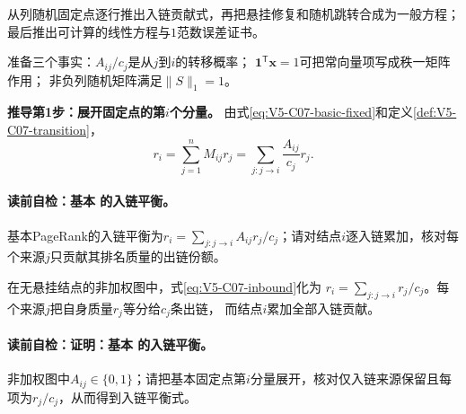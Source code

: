\label{struct:V5-C07-CH11}

\begin{derivationgoalbox}
从列随机固定点逐行推出入链贡献式，再把悬挂修复和随机跳转合成为一般\PageRank{}方程；
最后推出可计算的线性方程与$1$范数误差证书。
\end{derivationgoalbox}
\begin{derivationprepbox}
准备三个事实：$A_{ij}/c_j$是从$j$到$i$的转移概率；
$\boldsymbol1^{\mathsf T}\boldsymbol x=1$可把常向量项写成秩一矩阵作用；
非负列随机矩阵满足$\|S\|_1=1$。
\end{derivationprepbox}

\textbf{推导第1步：展开固定点的第$i$个分量。}
由式\eqref{eq:V5-C07-basic-fixed}和定义\ref{def:V5-C07-transition}，
\begin{equation}
r_i=\sum_{j=1}^nM_{ij}r_j
=\sum_{j:j\to i}\frac{A_{ij}}{c_j}r_j.
\label{eq:V5-C07-inbound}
\end{equation}
\paragraph{读前自检：基本 的入链平衡。}基本PageRank的入链平衡为$r_i=\sum_{j:j\to i}A_{ij}r_j/c_j$；请对结点$i$逐入链累加，核对每个来源$j$只贡献其排名质量的出链份额。\par

\begin{proposition}\label{prop:V5-C07-inbound-balance}
在无悬挂结点的非加权图中，式\eqref{eq:V5-C07-inbound}化为
$r_i=\sum_{j:j\to i}r_j/c_j$。每个来源$j$把自身质量$r_j$等分给$c_j$条出链，
而结点$i$累加全部入链贡献。
\end{proposition}
\paragraph{读前自检：证明：基本 的入链平衡。}非加权图中$A_{ij}\in\{0,1\}$；请把基本固定点第$i$分量展开，核对仅入链来源保留且每项为$r_j/c_j$，从而得到入链平衡式。\par

